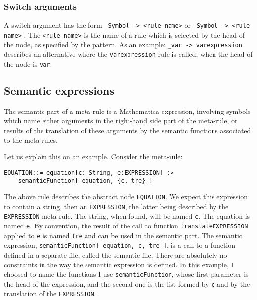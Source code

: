 \documentclass[12pt]{article}
\begin{document}
\subsubsection{Switch arguments}

A switch argument has the form 
\texttt{\_Symbol -> <rule name>} or 
\texttt{\_Symbol -> {<rule name>}} .
 The 
\texttt{<rule name>} is the name of a rule which is selected by the head of the node, as specified
 by the pattern.
 As an example: 
\texttt{\_var -> varexpression} describes an alternative where the 
\texttt{varexpression} rule is called, when the head of the node is 
\texttt{var}.
 
\subsection{Semantic expressions}

The semantic part of a meta-rule is a Mathematica expression, involving
 symbols which name either arguments in the right-hand side part of the
 meta-rule, or results of the translation of these arguments by the semantic
 functions associated to the meta-rules.
 
Let us explain this on an example.
Consider the meta-rule:
\begin{verbatim}
EQUATION::= equation[c:_String, e:EXPRESSION] :> 
    semanticFunction[ equation, {c, tre} ] 
\end{verbatim}

The above rule describes the abstract node 
\texttt{EQUATION}.
 We expect this expression to contain a string, then an 
\texttt{EXPRESSION}, the latter being described by the 
\texttt{EXPRESSION} meta-rule.
 The string, when found, will be named 
\texttt{c}.
 The equation is named 
\texttt{e}.
 By convention, the result of the call to function 
\texttt{translateEXPRESSION} applied to 
\texttt{e} is named 
\texttt{tre} and can be used in the semantic part.
 The semantic expression, 
\texttt{semanticFunction[ equation, {c, tre} ]}, is a call to a function defined in a separate file, called the semantic
 file.
 There are absolutely no constraints in the way the semantic expression
 is defined.
 In this example, I choosed to name the functions I use 
\texttt{semanticFunction}, whose first parameter is the head of the expression, and the second one
 is the list formed by 
\texttt{c} and by the translation of the 
\texttt{EXPRESSION}.
 
\end{document}
